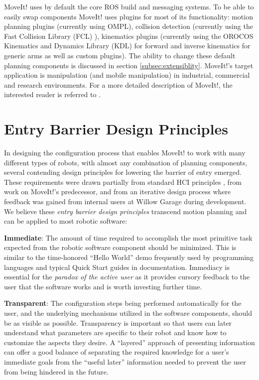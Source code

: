 \documentclass[10pt,journal,compsoc]{joser1}
\begin{document}
{MoveIt! uses by default the core ROS build and messaging systems. To be able to easily swap
components MoveIt! uses plugins for most of its functionality: motion planning
plugins (currently using OMPL), collision detection (currently using the Fast
Collision Library (FCL) \cite{fcl}), kinematics plugins (currently using  the
OROCOS Kinematics and Dynamics Library (KDL) \cite{kdl} for forward and inverse
kinematics for generic arms as well as custom plugins). The ability to change
these default planning components is discussed in section
\ref{subsec:extensiblity}. MoveIt!'s target application is manipulation (and
mobile manipulation) in industrial, commercial and research environments. For a
more detailed description of MoveIt!, the interested reader is referred to
\cite{moveit}.


\section{Entry Barrier Design Principles}
\label{sec::requirements}

In designing the configuration process that enables MoveIt! to work with many
different types of robots, with almost any combination of planning components,
several contending design principles for lowering the barrier of entry emerged.
These requirements were drawn partially from standard HCI principles
\cite{galitz2007essential}, from work on MoveIt!'s predecessor, and from an
iterative design process where feedback was gained from internal users at Willow
Garage during development. We believe these \textit{entry barrier design
principles} transcend motion planning and can be applied to most robotic
software:

{\bf Immediate}: The amount of time required to accomplish the most primitive
task expected from the robotic software component should be minimized. This is
similar to the time-honored ``Hello World'' demo frequently used by programming
languages and typical Quick Start guides in documentation. Immediacy is
essential for the \textit{paradox of the active user} as it provides cursory
feedback to the user that the software works and is worth investing further
time.

{\bf Transparent}: The configuration steps being performed automatically for the
user, and the underlying mechanisms utilized in the software components, should
be as visible as possible. Transparency is important so that users can later
understand what parameters are specific to their robot and know how to customize
the aspects they desire. A ``layered'' approach of presenting information can
offer a good balance of separating the required knowledge for a user's immediate
goals from the ``useful later'' information needed to prevent the user from
being hindered in the future.

}
\end{document}
